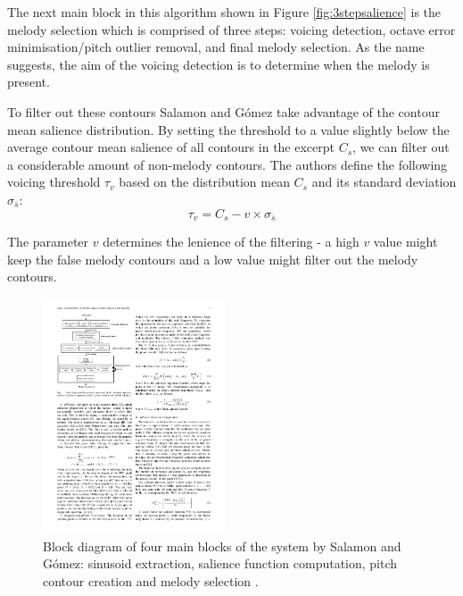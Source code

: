 The next main block in this algorithm shown in Figure \ref{fig:3stepsalience} is the melody selection which is comprised of three steps: voicing detection, octave error minimisation/pitch outlier removal, and final melody selection.
As the name suggests, the aim of the voicing detection is to determine when the melody is present.


To filter out these contours Salamon and G\'{o}mez take advantage of the contour mean salience distribution.
By setting the threshold to a value slightly below the average contour mean salience of all contours in the excerpt $C_{s}$, we can filter out a considerable amount of non-melody contours. The authors define the following voicing threshold $\tau_{v}$ based on the distribution mean $C_{s}$ and its standard deviation $\sigma_{\overline{s}}$:
\begin{equation}
\tau_{v} = C_{s} - v \times \sigma_{\overline{s}}
\end{equation}

The parameter $v$ determines the lenience of the filtering - a high $v$ value might keep the false melody contours and a low value might filter out the melody contours.

\begin{figure}
  \vspace{-30pt}

  \begin{center}
    \includegraphics[width=0.48\textwidth]{Figures/salamon4blocksdiagram}
  \end{center}
  \caption{Block diagram of four main blocks of the system by Salamon and G\'{o}mez: sinusoid extraction, salience function computation, pitch contour creation and melody selection \cite{salamon}.}
  \label{fig:salomondetailed}
\end{figure}



